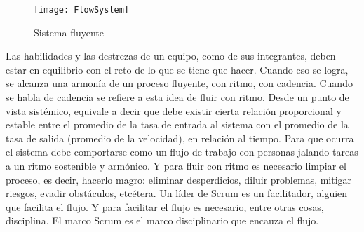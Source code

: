 \begin{figure}[h] 
  \centering
  \texttt{[image: FlowSystem]}
  \caption{Sistema fluyente}
  \centering
  \label{fig:FlowSystem} %
\end{figure}

Las habilidades y las destrezas de un equipo, como de sus integrantes, deben estar en equilibrio con el reto de lo que se tiene que hacer. Cuando eso se logra, se alcanza una armonía de un proceso fluyente, con ritmo, con cadencia. Cuando se habla de cadencia se refiere a esta idea de fluir con ritmo. Desde un punto de vista sistémico, equivale a decir que debe existir cierta relación proporcional y estable entre el promedio de la tasa de entrada al sistema con el promedio de la tasa de salida (promedio de la velocidad), en relación al tiempo. Para que ocurra el sistema debe comportarse como un flujo de trabajo con personas jalando tareas a un ritmo sostenible y armónico. Y para fluir con ritmo es necesario limpiar el proceso, es decir, hacerlo magro: eliminar desperdicios, diluir problemas, mitigar riesgos, evadir obstáculos, etcétera. Un líder de Scrum es un facilitador, alguien que facilita el flujo. Y para facilitar el flujo es necesario, entre otras cosas, disciplina. El marco Scrum es el marco disciplinario que encauza el flujo.
